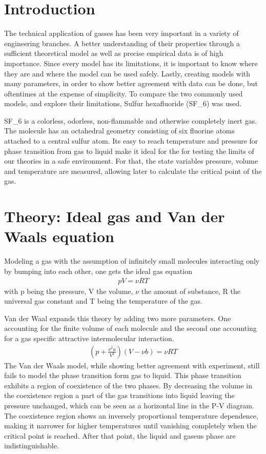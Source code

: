 \documentclass[a4paper,10pt,twocolumn]{article}
\begin{document}
    \section{Introduction}\label{sec:introdction}
    The technical application of gasses has been very important in a variety of engineering branches. 
    A better understanding of their properties through a sufficient theoretical model as well as precise empirical data is of high importance.
    Since every model has its limitations, it is important to know where they are and where the model can be used safely.
    Lastly, creating models with many parameters, in order to show better agreement with data can be done, but oftentimes at the expense of simplicity.
    To compare the two commonly used models, and explore their limitations, Sulfur hexafluoride (SF_6\)) was used.
    
    SF_6\) is a colorless, odorless, non-flammable and otherwise completely inert gas. 
    The molecule has an octahedral geometry consisting of six fluorine atoms attached to a central sulfur atom.
    Its easy to reach temperature and pressure for phase transition from gas to liquid make it ideal for the for testing the limits of our theories in a safe environment.
    For that, the state variables pressure, volume and temperature are measured, allowing later to calculate the critical point of the gas.
    \section{Theory: Ideal gas and Van der Waals equation}\label{sec:theory}
    Modeling a gas with the assumption of infinitely small molecules interacting only by bumping into each other, one gets the ideal gas equation
    \begin{align}
        pV=\nu RT
    \end{align}
    with p being the pressure, V the volume, $\nu$ the amount of substance, R the universal gas constant and T being the temperature of the gas.
    
    Van der Waal expands this theory by adding two more parameters.
    One accounting for the finite volume of each molecule and the second one accounting for a gas specific attractive intermolecular interaction.
    \begin{align}
    (p+\frac{\nu^2 a}{V^2})(V-\nu b) = \nu RT
    \end{align}
    The Van der Waals model, while showing better agreement with experiment, still fails to model the phase transition form gas to liquid.
    This phase transition exhibits a region of coexistence of the two phases. 
    By decreasing the volume in the coexistence region a part of the gas transitions into liquid leaving the pressure unchanged, which can be seen as a horizontal line in the P-V diagram.
    The coexistence region shows an inversely proportional temperature dependence, making it narrower for higher temperatures until vanishing completely when the critical point is reached.
    After that point, the liquid and gaseus phase are indistinguishable.
\end{document}
